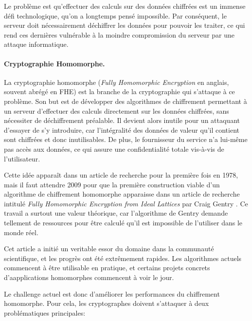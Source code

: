 Le problème est qu'effectuer des calculs sur des données chiffrées est un immense défi technologique, qu'on a longtemps pensé impossible. Par conséquent, le serveur doit nécessairement déchiffrer les données pour pouvoir les traiter, ce qui rend ces dernières vulnérable à la moindre compromission du serveur par une attaque informatique.


\paragraph{Cryptographie Homomorphe.}
La cryptographie homomorphe (\textit{Fully Homomorphic Encryption} en anglais, souvent abrégé en FHE) est la branche de la cryptographie qui s'attaque à ce problème. Son but est de développer des algorithmes de chiffrement permettant à un serveur d'effectuer des calculs directement sur les données chiffrées, sans nécessiter de déchiffrement préalable. Il devient alors inutile pour un attaquant d'essayer de s'y introduire, car l'intégralité des données de valeur qu'il contient sont chiffrées et donc inutilisables. De plus, le fournisseur du service n'a lui-même pas accès aux données, ce qui assure une confidentialité totale vis-à-vis de l'utilisateur.

Cette idée apparaît dans un article de recherche pour la première fois en 1978, mais il faut attendre 2009 pour que la première construction viable d'un algorithme de chiffrement homomorphe apparaisse dans un article de recherche intitulé \textit{Fully Homomorphic Encryption from Ideal Lattices} par Craig Gentry \cite{STOC:Gentry09}. Ce travail a surtout une valeur théorique, car l'algorithme de Gentry demande tellement de ressources pour être calculé qu'il est impossible de l'utiliser dans le monde réel.

Cet article a initié un veritable essor du domaine dans la communauté scientifique, et les progrès ont été extrêmement rapides. Les algorithmes actuels commencent à être utilisable en pratique, et certains projets concrets d'aapplications homomorphes commencent à voir le jour.

Le challenge actuel est donc d'améliorer les performances du chiffrement homomorphe. Pour cela, les cryptographes doivent s'attaquer à deux problématiques principales:

